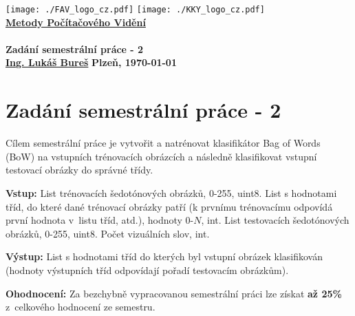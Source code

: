 \documentclass[12pt, a4paper]{article}
\newcommand{\cisloZadani}{Zadání semestrální práce - 2}
\begin{document}
 









 
\begin{titlepage}
\begin{center}
	\texttt{[image: ./FAV\_logo\_cz.pdf]}
	\hspace*{\fill}
	\texttt{[image: ./KKY\_logo\_cz.pdf]}\\
	\vspace*{\fill}
	\textbf{\Huge{\href{http://www.kky.zcu.cz/cs/courses/mpv}{Metody Počítačového Vidění} \\ ~ \\ \cisloZadani}}\\
	\vspace*{\fill}
	\textbf{\large{\href{mailto:LBures@kky.zcu.cz}{Ing. Lukáš Bureš}}} \hfill \textbf{\large{Plzeň, \today}}
\end{center}
\end{titlepage}








\section*{\cisloZadani}

\par{Cílem semestrální práce je vytvořit a natrénovat klasifikátor Bag of Words (BoW) na vstupních trénovacích obrázcích a následně klasifikovat vstupní testovací obrázky do správné třídy.}

\par{\textbf{Vstup:} List trénovacích šedotónových obrázků, 0-255, uint8. List s hodnotami tříd, do které dané trénovací obrázky patří (k prvnímu trénovacímu odpovídá první hodnota v~listu tříd, atd.), hodnoty 0-$N$, int. List testovacích šedotónových obrázků, 0-255, uint8. Počet vizuálních slov, int.}

\par{\textbf{Výstup:} List s hodnotami tříd do kterých byl vstupní obrázek klasifikován (hodnoty výstupních tříd odpovídají pořadí testovacím obrázkům).}

\par{\textbf{Ohodnocení:} Za bezchybně vypracovanou semestrální práci lze získat \textbf{až 25\%} z~celkového hodnocení ze semestru.}
\end{document}
